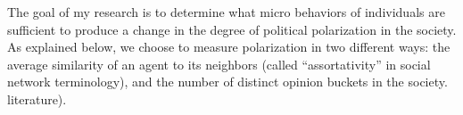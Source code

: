 The goal of my research is to determine what micro behaviors of individuals
are sufficient to produce a change in the degree of political polarization in
the society. As explained below, we choose to measure polarization in two
different ways: the average similarity of an agent to its neighbors (called
``assortativity'' in social network terminology), and the number of distinct opinion buckets in the society. 
literature).
